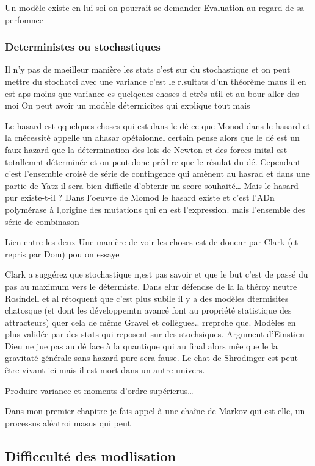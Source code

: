 Un modèle existe en lui soi on pourrait se demander Evaluation au regard
de sa perfomnce

\subsubsection{Deterministes ou
stochastiques}\label{deterministes-ou-stochastiques}

Il n'y pas de maeilleur manière les stats c'est sur du stochastique et
on peut mettre du stochatci avec une variance c'est le r.sultats d'un
théorème maus il en est aps moins que variance es quelqeues choses d
etrès util et au bour aller des moi On peut avoir un modèle détermicites
qui explique tout mais

Le hasard est qquelques choses qui est dans le dé ce que Monod dans le
hasard et la cnécessité appelle un ahasar opétaionnel certain pense
alors que le dé est un faux hazard que la détermination des lois de
Newton et des forces inital est totallemnt déterminée et on peut donc
prédire que le résulat du dé. Cependant c'est l'ensemble croisé de série
de contingence qui amènent au hasrad et dans une partie de Yatz il sera
bien difficile d'obtenir un score souhaité\ldots{} Mais le hasard pur
existe-t-il ? Dans l'oeuvre de Momod le hasard existe et c'est l'ADn
polymérase à l,origine des mutations qui en est l'expression. mais
l'ensemble des série de combinason

Lien entre les deux Une manière de voir les choses est de donenr par
Clark (et repris par Dom) pou on essaye

Clark a suggérez que stochastique n,est pas savoir et que le but c'est
de passé du pas au maximum vers le détermiste. Dans elur défendse de la
la théroy neutre Rosindell et al rétoquent que c'est plus subile il y a
des modèles dtermisites chatosque (et dont les développemtn avancé font
au propriété statistique des attracteurs) quer cela de même Gravel et
collègues.. rreprche que. Modèles en plus validée par des stats qui
reposent sur des stochsiques. Argument d'Einstien Dieu ne jue pas au dé
face à la quantique qui au final alors mêe que le la gravitaté générale
sans hazard pure sera fause. Le chat de Shrodinger est peut-être vivant
ici mais il est mort dans un autre univers.

Produire variance et moments d'ordre supérierus\ldots{}

Dans mon premier chapitre je fais appel à une chaîne de Markov qui est
elle, un processus aléatroi masus qui peut

\subsection{Difficculté des
modlisation}\label{difficcultuxe9-des-modlisation}

